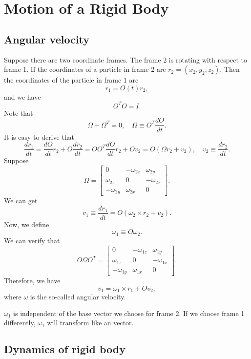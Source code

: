 \chapter{Motion of a Rigid Body}
\section{Angular velocity}
Suppose there are two coordinate frames. The frame 2 is rotating with respect to frame 1. If the coordinates of a particle in frame 2 are $r_2=(x_2,y_2,z_2)$.
Then the coordinates of the particle in frame 1 are
\[r_1 = O(t)r_2 ,\]
and we have
\[O^TO=I.\]
Note that
\[\Omega + \Omega^T= 0 ,\quad \Omega \equiv O^T\frac{dO}{dt}.\]
It is easy to derive that
\[\frac{dr_1}{dt} = \frac{dO}{dt}r_2 + O\frac{dr_2}{dt} = OO^T \frac{dO}{dt}r_2 + Ov_2  = O (\Omega r_2 + v_2) ,\quad v_2 \equiv \frac{dr_2}{dt}.\]
Suppose
\[\Omega = \left[ \begin{matrix} 0& -\omega_{2z}& \omega_{2y}\\ \omega_{2z}& 0& -\omega_{2x}\\ -\omega_{2y}& \omega_{2x}& 0\end{matrix} \right] .\]
We can get
\[v_1 \equiv \frac{dr_1}{dt}  = O(\omega_2 \times r_2 + v_2) .\]
Now, we define
\[\omega_1 \equiv O\omega_2.\]
We can verify that
\[O \Omega O^T = \left[ \begin{matrix} 0& -\omega_{1z}& \omega_{1y}\\ \omega_{1z}& 0& -\omega_{1x}\\ -\omega_{1y}& \omega_{1x}& 0\end{matrix} \right] .\]
Therefore, we have
\[v_1 = \omega_1 \times r_1 + Ov_2 ,\]
where $\omega$ is the so-called angular velocity.
\begin{note}
$\omega_1$ is independent of the base vector we choose for frame 2.
If we choose frame 1 differently, $\omega_1$ will transform like an vector.
\end{note}

\section{Dynamics of rigid body}
